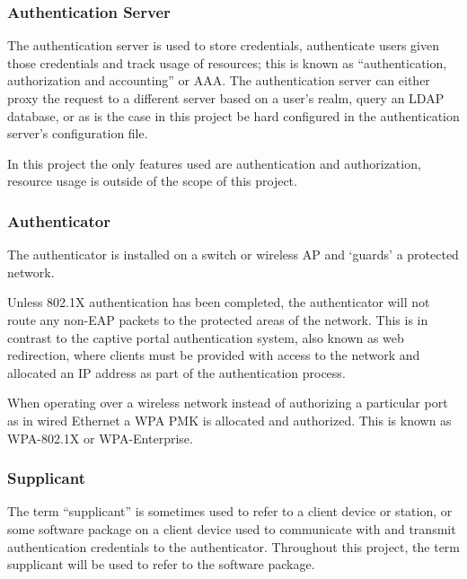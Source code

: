 \documentclass[pdftex, 12pt, a4paper]{article}
\begin{document}

\subsubsection{Authentication Server}
The authentication server is used to store credentials, authenticate users given those credentials and track usage of resources; this is known as ``authentication, authorization and accounting'' or AAA\cite{RFC2865,RFC2866}.  The authentication server can either proxy the request to a different server based on a user's realm, query an LDAP database, or as is the case in this project be hard configured in the authentication server's configuration file.

In this project the only features used are authentication and authorization, resource usage is outside of the scope of this project.

\subsubsection{Authenticator}
The authenticator is installed on a switch or wireless AP and `guards' a protected network.

Unless 802.1X authentication has been completed, the authenticator will not route any non-EAP packets to the protected areas of the network\cite{8021X-book}. This is in contrast to the captive portal authentication system, also known as web redirection, where clients must be provided with access to the network and allocated an IP address as part of the authentication process\cite{wifi-dog}.

When operating over a wireless network instead of authorizing a particular port as in wired Ethernet a WPA PMK is allocated and authorized.  This is known as WPA-802.1X or WPA-Enterprise\cite{IEEE8021X-2004}.
\subsubsection{Supplicant}
The term ``supplicant'' is sometimes used to refer to a client device or station, or some software package on a client device used to communicate with and transmit authentication credentials to the authenticator.  Throughout this project, the term supplicant will be used to refer to the software package.
\end{document}
